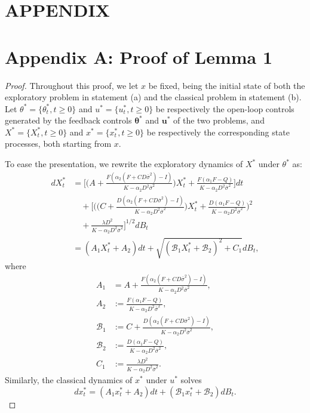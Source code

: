 \documentclass[onecolumn, journal]{IEEEtran} %
\begin{document}
	\section*{APPENDIX}
	

	
	\section*{Appendix A: Proof of Lemma 1}
	\begin{proof}
		Throughout this proof, we let \(x\) be fixed, being the initial state of both the exploratory problem in statement (a) and the classical problem in statement (b). Let \(\theta^{*}=\{\theta^{*}_{t},t\geq 0\}\) and \(u^{*}=\{u^{*}_{t},t\geq 0\}\) be respectively the open-loop controls generated by the feedback controls \(\boldsymbol{\theta}^{*}\) and \(\boldsymbol{u}^{*}\) of the two problems, and \(X^{*}=\{X^{*}_{t},t\geq 0\}\) and \(x^{*}=\{x^{*}_{t},t\geq 0\}\) be respectively the corresponding state processes, both starting from \(x\).
		
		To ease the presentation, we rewrite the exploratory dynamics of \(X^{*}\) under \(\theta^{*}\) as:
		\begin{equation*}
			\begin{aligned}
				dX_t^* &= \bigg[ \Big( A + \tfrac{F(\alpha_2(F + CD\overline{\sigma}^2) - I)}{K - \alpha_2D^2\overline{\sigma}^2} \Big) X_t^* + \tfrac{F(\alpha_1F - Q)}{K - \alpha_2D^2\overline{\sigma}^2} \bigg] dt \\
				&\quad+ \bigg[ \Big( \big( C + \tfrac{D(\alpha_2(F + CD\overline{\sigma}^2) - I)}{K - \alpha_2D^2\overline{\sigma}^2} \big) X_t^* + \tfrac{D(\alpha_1F - Q)}{K - \alpha_2D^2\overline{\sigma}^2} \Big)^2 \\
				&\quad+ \tfrac{\lambda D^2}{K - \alpha_2D^2\overline{\sigma}^2} \bigg]^{1/2} dB_t\\
				&=(A_{1}X_{t}^{*}+A_{2})dt+\sqrt{(\mathcal{B}_{1}X_{t}^{*}+\mathcal{B}_{2})^{2}+C_{1}}dB_{t},
			\end{aligned}
		\end{equation*}
		where
		\[
		\begin{aligned}
			A_{1} &= A+\frac{F(\alpha_{2}(F+CD\overline{\sigma}^2)-I)}{K-\alpha_{2}D^{2}\overline{\sigma}^2}, \\
			A_{2} &:= \frac{F(\alpha_{1}F-Q)}{K-\alpha_{2}D^{2}\overline{\sigma}^2}, \\
			\mathcal{B}_{1} &:= C+\frac{D(\alpha_{2}(F+CD\overline{\sigma}^2)-I)}{K-\alpha_{2}D^{2}\overline{\sigma}^2}, \\
			\mathcal{B}_{2} &:= \frac{D(\alpha_{1}F-Q)}{K-\alpha_{2}D^{2}\overline{\sigma}^2}, \\
			C_{1} &:= \frac{\lambda D^{2}}{K-\alpha_{2}D^{2}\overline{\sigma}^2}.
		\end{aligned}
		\]
		Similarly, the classical dynamics of \(x^{*}\) under \(u^{*}\) solves
		\[
		dx_{t}^{*}=(A_{1}x_{t}^{*}+A_{2})dt+(\mathcal{B}_{1}x_{t}^{*}+\mathcal{B}_{2})dB_{t}.
		\]
		

\end{proof}
\end{document}
